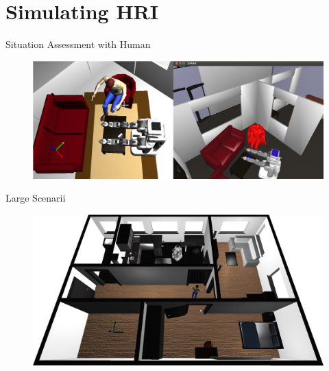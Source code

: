 \documentclass[compress]{beamer}
\begin{document}



\section{Simulating HRI}

\begin{frame}{Situation Assessment with Human}
    \begin{figure}
        \centering
        \includegraphics[width=\linewidth]{morsespark}
    \end{figure}
\end{frame}

\begin{frame}{Large Scenarii}
    \begin{figure}
        \centering
        \includegraphics[width=\linewidth]{morse_apartment}
    \end{figure}
\end{frame}
\end{document}
